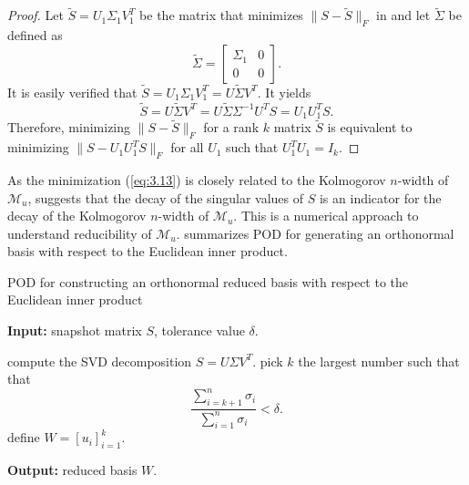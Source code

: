 \begin{proof}
Let $\tilde S = U_1 \Sigma_1 V_1^T$ be the matrix that minimizes $\| S - \tilde S \|_F$ in  and let $\tilde \Sigma$ be defined as
\begin{equation} \label{eq:3.17}
	\tilde \Sigma =
	\begin{bmatrix}
		\Sigma_1 & 0 \\
		0 & 0
	\end{bmatrix}.	
\end{equation}
It is easily verified that $\tilde S = U_1 \Sigma_1 V_1^T = U \tilde \Sigma V^T$. It yields
\begin{equation} \label{eq:3.18}
	\tilde S =  U \tilde \Sigma V^T = U \tilde \Sigma \Sigma^{-1} U^T S = U_1 U_1^T S.
\end{equation}
Therefore, minimizing $\| S - \tilde S \|_F$ for a rank $k$ matrix $\tilde S$ is equivalent to minimizing $\| S - U_1U_1^T S \|_F$ for all $U_1$ such that $U_1^T U_1 = I_k$.
\end{proof}
As the minimization (\ref{eq:3.13}) is closely related to the Kolmogorov $n$-width of $\mathcal M_u$,  suggests that the decay of the singular values of $S$ is an indicator for the decay of the Kolmogorov $n$-width of $\mathcal M_u$. This is a numerical approach to understand reducibility of $\mathcal M_u$.  summarizes POD for generating an orthonormal basis with respect to the Euclidean inner product.

\begin{algorithm} 
	\caption{POD for constructing an orthonormal reduced basis with respect to the Euclidean inner product} \label{alg:3.1}
	\textbf{Input:} snapshot matrix $S$, tolerance value $\delta$.
	\begin{algorithmic} [1]
		\State compute the SVD decomposition $S = U \Sigma V^T$.
		\State pick $k$ the largest number such that that
		\[
			\frac{\sum_{i=k+1}^n \sigma_i}{\sum_{i=1}^n \sigma_i} < \delta.
		\]
		\State define $W = [u_i]_{i=1}^k$.
	\end{algorithmic}
	\vspace{0.5cm}
	\textbf{Output:} reduced basis $W$.
\end{algorithm}

